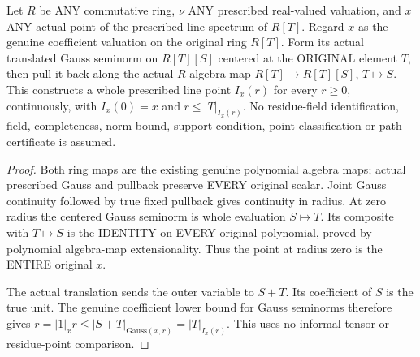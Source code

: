 \begin{definition}
\label{spectrum:actual-line-gauss-inflation}
\leanok
{}
Let $R$ be ANY commutative ring, $\nu$ ANY prescribed real-valued
valuation, and $x$ ANY actual point of the prescribed line spectrum
of $R[T]$. Regard $x$ as the genuine coefficient valuation on the
original ring $R[T]$. Form its actual translated Gauss seminorm on
$R[T][S]$ centered at the ORIGINAL element $T$, then pull it back
along the actual $R$-algebra map $R[T]\to R[T][S]$, $T\mapsto S$.
This constructs a whole prescribed line point $I_x(r)$ for every
$r\ge0$, continuously, with $I_x(0)=x$ and $r\le |T|_{I_x(r)}$.
No residue-field identification, field, completeness, norm bound,
support condition, point classification or path certificate is assumed.
\end{definition}
\begin{proof}
Both ring maps are the existing genuine polynomial algebra maps;
actual prescribed Gauss and pullback preserve EVERY original
scalar. Joint Gauss continuity followed by true fixed pullback
gives continuity in radius. At zero radius the centered Gauss
seminorm is whole evaluation $S\mapsto T$. Its composite with
$T\mapsto S$ is the IDENTITY on EVERY original polynomial,
proved by polynomial algebra-map extensionality. Thus the point
at radius zero is the ENTIRE original $x$.

The actual translation sends the outer variable to $S+T$.
Its coefficient of $S$ is the true unit. The genuine coefficient
lower bound for Gauss seminorms therefore gives
$r=|1|_x r\le |S+T|_{\mathrm{Gauss}(x,r)}=|T|_{I_x(r)}$.
This uses no informal tensor or residue-point comparison.
\end{proof}

